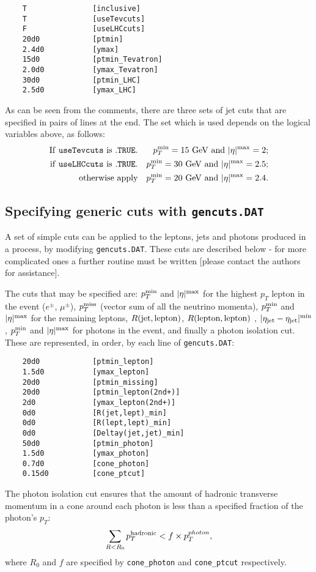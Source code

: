 \documentclass[12pt]{article}
\begin{document}
\begin{verbatim}
    T               [inclusive]
    T               [useTevcuts]
    F               [useLHCcuts]
    20d0            [ptmin]
    2.4d0           [ymax]
    15d0            [ptmin_Tevatron]
    2.0d0           [ymax_Tevatron]
    30d0            [ptmin_LHC]
    2.5d0           [ymax_LHC]
\end{verbatim}
As can be seen from the comments, there are three sets of jet cuts that
are specified in pairs of lines at the end. The set which is used
depends on the logical variables above, as follows:
\begin{eqnarray}
{\rm If }~{\tt useTevcuts}~{\rm is}~{\tt .TRUE.} &&
 p_T^{\rm min}=15~{\rm GeV}~{\rm and}~|\eta|^{\rm max}=2; \nonumber \\
{\rm if }~{\tt useLHCcuts}~{\rm is}~{\tt .TRUE.} &&
 p_T^{\rm min}=30~{\rm GeV}~{\rm and}~|\eta|^{\rm max}=2.5; \nonumber \\
{\rm otherwise~apply} &&
 p_T^{\rm min}=20~{\rm GeV}~{\rm and}~|\eta|^{\rm max}=2.4. \nonumber 
\end{eqnarray}

\subsection{Specifying generic cuts with {\tt gencuts.DAT}}

A set of simple cuts can be applied to the leptons, jets and photons
produced in a process, by modifying {\tt gencuts.DAT}. These cuts
are described below - for more complicated ones a further routine
must be written [please contact the authors for assistance].

The cuts that may be specified are: $p_T^{\rm min}$
and $|\eta|^{\rm max}$ for the highest $p_T$ lepton in the event
($e^\pm$, $\mu^\pm$),
$p_T^{\rm miss}$ (vector sum of all the neutrino momenta),
$p_T^{\rm min}$ and $|\eta|^{\rm max}$ for the
remaining leptons,
$R({\rm jet},{\rm lepton})$, $R({\rm lepton},{\rm lepton})$
, $|\eta_{\rm jet}-\eta_{\rm jet}|^{\rm min}$, $p_T^{\rm min}$
and $|\eta|^{\rm max}$ for photons in the event,
and finally a photon isolation cut.
These are represented, in order, by each line of {\tt gencuts.DAT}:
\begin{verbatim}
    20d0            [ptmin_lepton]
    1.5d0           [ymax_lepton]
    20d0            [ptmin_missing]
    20d0            [ptmin_lepton(2nd+)]
    2d0             [ymax_lepton(2nd+)]
    0d0             [R(jet,lept)_min]
    0d0             [R(lept,lept)_min]
    0d0             [Deltay(jet,jet)_min]
    50d0            [ptmin_photon]
    1.5d0           [ymax_photon]
    0.7d0           [cone_photon]
    0.15d0          [cone_ptcut]
\end{verbatim}
The photon isolation cut ensures that the amount of hadronic
transverse momentum in a cone around each photon is less than
a specified fraction of the photon's $p_T$:
\begin{displaymath}
\sum_{R < R_0} p_T^{\rm hadronic} < f \times p_T^{photon},
\end{displaymath}
where $R_0$ and $f$ are specified by {\tt cone\_photon} and
{\tt cone\_ptcut} respectively.
\end{document}
